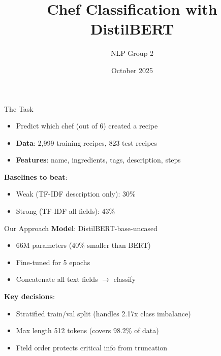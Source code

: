 \documentclass{beamer}
\title{Chef Classification with DistilBERT}
\author{NLP Group 2}
\institute{Instituto Superior Técnico}
\date{October 2025}
\begin{document}
\frame{\titlepage}

\begin{frame}{The Task}
\begin{itemize}
    \item Predict which chef (out of 6) created a recipe
    \item \textbf{Data}: 2,999 training recipes, 823 test recipes
    \item \textbf{Features}: name, ingredients, tags, description, steps
\end{itemize}

\vspace{0.5cm}

\textbf{Baselines to beat}:
\begin{itemize}
    \item Weak (TF-IDF description only): 30\%
    \item Strong (TF-IDF all fields): 43\%
\end{itemize}
\end{frame}

\begin{frame}{Our Approach}
\textbf{Model}: DistilBERT-base-uncased
\begin{itemize}
    \item 66M parameters (40\% smaller than BERT)
    \item Fine-tuned for 5 epochs
    \item Concatenate all text fields $\rightarrow$ classify
\end{itemize}

\vspace{0.5cm}

\textbf{Key decisions}:
\begin{itemize}
    \item Stratified train/val split (handles 2.17x class imbalance)
    \item Max length 512 tokens (covers 98.2\% of data)
    \item Field order protects critical info from truncation
\end{itemize}
\end{frame}
\end{document}
